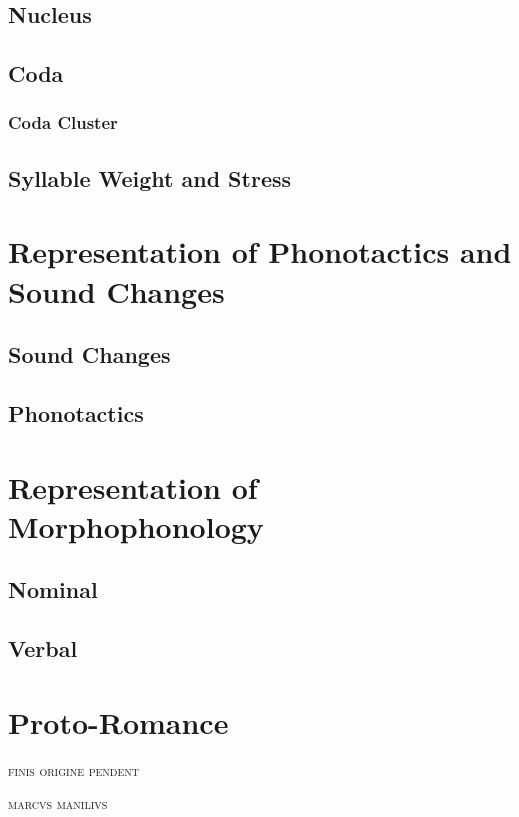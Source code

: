 \documentclass{report}
\begin{document}
\section{Nucleus}

\section{Coda}

\subsection{Coda Cluster}

\section{Syllable Weight and Stress}

\chapter{Representation of Phonotactics and Sound Changes}

\section{Sound Changes}

\section{Phonotactics}

\chapter{Representation of Morphophonology}

\section{Nominal}

\section{Verbal}

\chapter{Proto-Romance}

\epigraph{\textsc{finis origine pendent}}{\textsc{marcvs manilivs}}
\end{document}
